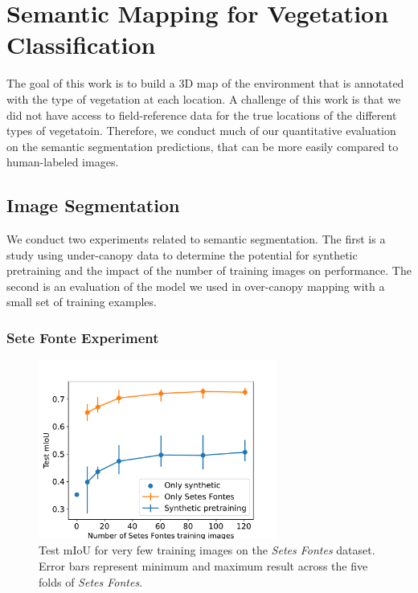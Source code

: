 \section{Semantic Mapping for Vegetation Classification}
The goal of this work is to build a 3D map of the environment that is annotated with the type of vegetation at each location. A challenge of this work is that we did not have access to field-reference data for the true locations of the different types of vegetatoin. Therefore, we conduct much of our quantitative evaluation on the semantic segmentation predictions, that can be more easily compared to human-labeled images. 

\subsection{Image Segmentation}
We conduct two experiments related to semantic segmentation. The first is a study using under-canopy data to determine the potential for synthetic pretraining and the impact of the number of training images on performance. The second is an evaluation of the model we used in over-canopy mapping with a small set of training examples.
\subsubsection{Sete Fonte Experiment}

\begin{figure}
    \centering
    \includegraphics[width=0.7\textwidth]{figs/results/semantic_segmentation/synthetic_experiments_mious.pdf}
    \caption{Test mIoU for very few training images on the \textit{Setes Fontes} dataset.
    Error bars represent minimum and maximum result across the five folds of \textit{Setes Fontes}.}
    \label{fig:results:semantic-size-pretraining}
\end{figure}

